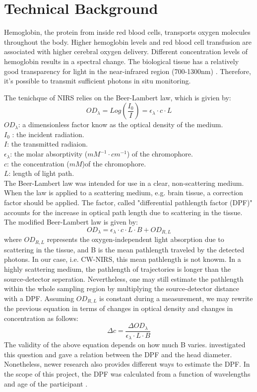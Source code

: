 \section{Technical Background}
Hemoglobin, the protein from inside red blood cells, transports oxygen molecules throughout the body. Higher hemoglobin levels and red blood cell transfusion are associated with higher cerebral oxygen delivery. Different concentration levels of hemoglobin results in a spectral change. The biological tissue has a relatively good transparency for light in the near-infrared region (700-1300nm) \cite{doi:10.1126/science.929199}. Therefore, it's possible to transmit sufficient photons in situ monitoring. 

The tenichque of NIRS relies on the Beer-Lambert law, which is givien by:
\[
OD_{\lambda} = Log(\frac {I_0}{I}) = \epsilon _{\lambda} \cdot c \cdot L
\]
$OD_{\lambda} $: a dimensionless factor know as the optical density of the medium.  \\
$I_0$ : the incident radiation. \\
$I$: the transmitted radiaion. \\
$\epsilon _{\lambda}$: the molar absorptivity ($mM^{-1} \cdot cm^{-1}$) of the chromophore. \\
$c$: the concentration ($mM$)of the chromophore. \\
$L$: length of light path. \\

The Beer-Lambert law was intended for use in a clear, non-scattering medium. When the law is applied to a scattering medium, e.g. brain tissue, a correction factor should be applied. The factor, called "differential pathlength factor (DPF)" accounts for the increase in optical path length due to scattering in the tissue. The modified Beer-Lambert law is given by:
\[
OD_{\lambda} = \epsilon _{\lambda} \cdot c \cdot L \cdot B + OD_{R,L}
\]
where $OD_{R,L}$ represents the oxygen-independent light absorption due to scattering in the tissue, and B is the mean pathlength traveled by the detected photons. In our case, i.e. CW-NIRS, this mean pathlength is not knowm. In a highly scattering medium, the pathlength of trajectories is longer than the source-detector seperation. Nevertheless, one may still estimate the pathlength within the whole sampling region by multiplying the source-detector distance with a DPF. Assuming $OD_{R,L}$ is constant during a measurement, we may rewrite the previous equation in terms of changes in optical density and changes in concentration as follows:
\[
\Delta c =\frac { \Delta OD_{\lambda}} {\epsilon _{\lambda} \cdot L \cdot B}
\]
The validity of the above equation depends on how much B varies. \cite {Delpy_1988} investigated this question and gave a relation between the DPF and the head diameter. Nonetheless, newer research also provides different ways to estimate the DPF. In the scope of this project, the DPF was calculated from a function of wavelengths and age of the participant \cite {Duncan1996MeasurementOC}.



